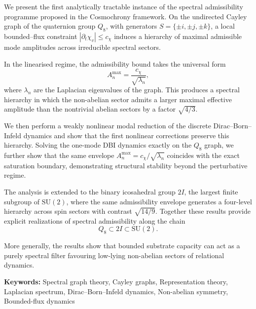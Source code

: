 We present the first analytically tractable instance of the spectral admissibility
programme proposed in the Cosmochrony framework.
On the undirected Cayley graph of the quaternion group $Q_8$, with generators
$S=\{\pm i,\pm j,\pm k\}$, a local bounded–flux constraint
$|\partial_t\chi_v|\le c_\chi$ induces a hierarchy of maximal admissible
mode amplitudes across irreducible spectral sectors.

In the linearised regime, the admissibility bound takes the universal form
\[
  A_n^{\max}=\frac{c_\chi}{\sqrt{\lambda_n}},
\]
where $\lambda_n$ are the Laplacian eigenvalues of the graph.
This produces a spectral hierarchy in which the non-abelian sector
admits a larger maximal effective amplitude than the nontrivial abelian sectors
by a factor $\sqrt{4/3}$.

We then perform a weakly nonlinear modal reduction of the discrete
Dirac–Born–Infeld dynamics and show that the first nonlinear corrections
preserve this hierarchy.
Solving the one-mode DBI dynamics exactly on the $Q_8$ graph, we further show
that the same envelope $A_n^{\max}=c_\chi/\sqrt{\lambda_n}$ coincides with the
exact saturation boundary, demonstrating structural stability beyond the
perturbative regime.

The analysis is extended to the binary icosahedral group $2I$, the largest finite
subgroup of $\mathrm{SU}(2)$, where the same admissibility envelope generates
a four-level hierarchy across spin sectors with contrast $\sqrt{14/9}$.
Together these results provide explicit realizations of spectral admissibility
along the chain
\[
  Q_8 \subset 2I \subset \mathrm{SU}(2).
\]

More generally, the results show that bounded substrate capacity can act as a
purely spectral filter favouring low-lying non-abelian sectors of relational
dynamics.

\medskip
\noindent\textbf{Keywords:} Spectral graph theory, Cayley graphs, Representation theory,
Laplacian spectrum, Dirac–Born–Infeld dynamics, Non-abelian symmetry, Bounded-flux dynamics

